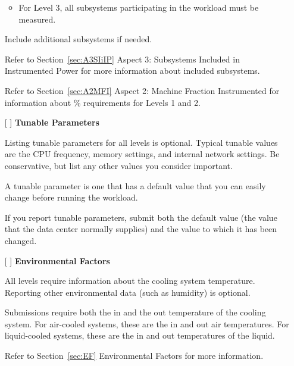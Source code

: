 \begin{itemize}
\begin{itemize}
\item
For Level 3, all subsystems participating in the workload must be measured.
\end{itemize}

Include additional subsystems if needed.

Refer to Section~\ref{sec:A3SIiIP} Aspect 3: Subsystems Included in Instrumented Power for more information about included subsystems.

Refer to Section~\ref{sec:A2MFI} Aspect 2: Machine Fraction Instrumented for information about \% requirements for Levels 1 and 2.
 
\item[{[ ]}]
\textbf{Tunable Parameters}

Listing tunable parameters for all levels is optional.
Typical tunable values are the CPU frequency, memory settings, and internal network settings. Be conservative, but list any other values you consider important.

A tunable parameter is one that has a default value that you can easily change before running the workload.

If you report tunable parameters, submit both the default value (the value that the data center normally supplies) and the value to which it has been changed.

\newpage
\item[{[ ]}]
\textbf{Environmental Factors}

All levels require information about the cooling system temperature. Reporting other environmental data (such as humidity) is optional. 

Submissions require both the in and the out temperature of the cooling system. For air-cooled systems, these are the in and out air temperatures. For liquid-cooled systems, these are the in and out temperatures of the liquid.

Refer to Section~\ref{sec:EF} Environmental Factors for more information.

\end{itemize}
